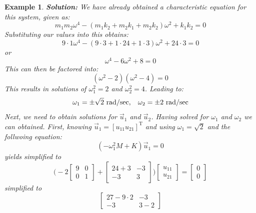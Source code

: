 \documentclass[12pt,letter]{article}
\newtheorem{ex}{Example}
\numberwithin{ex}{section} %
\newenvironment{example}{\begin{mdframed}[middlelinewidth=0.5mm]\begin{ex}\normalfont}{\end{ex}\end{mdframed}}
\numberwithin{re}{section} %
\begin{document}
\begin{example}
\textbf{Solution:} We have already obtained a characteristic equation for this system, given as:
\begin{equation}
m_1 m_2 \omega^4 - (m_1 k_2 + m_2 k_1 + m_2 k_2)\omega^2 + k_1 k_2 = 0
\end{equation}
Substituting our values into this obtains:
\begin{equation}
9 \cdot 1 \omega^4 - (9 \cdot 3 + 1 \cdot 24 + 1 \cdot 3)\omega^2 + 24 \cdot 3 = 0
\end{equation}
or
\begin{equation}
\omega^4 - 6\omega^2 + 8 =0
\end{equation}
This can then be factored into:
\begin{equation}
(\omega^2-2)(\omega^2-4)=0
\end{equation}
This results in solutions of $\omega^2_1 = 2$ and $\omega^2_2 = 4$. Leading to:
\begin{equation}
\omega_1 = \pm \sqrt{2} \text{ rad/sec}, \hspace{2ex} \omega_2 = \pm 2 \text{ rad/sec}
\end{equation}
Next, we need to obtain solutions for $\vec{u}_1$ and $\vec{u}_2$. Having solved for $\omega_1$ and $\omega_2$ we can obtained. First, knowing $\vec{u}_1 = [u_{11} u_{21}]^\text{T}$ and using $\omega_1 = \sqrt{2}$ and the follwoing equation:
\begin{equation}
	(-\omega_1^2 M  + K)\vec{u}_1 =0
\end{equation}
yields
simplified to
\begin{equation}
	 \bigg(-2\begin{bmatrix} 9 & 0 \\   0  & 1 \end{bmatrix} + \begin{bmatrix} 24+3 & -3 \\    -3  & 3 \end{bmatrix}\bigg)\begin{bmatrix} u_{11}\\ u_{21}\end{bmatrix} = \begin{bmatrix} 0\\ 0\end{bmatrix}
\end{equation}
simplified to
\begin{equation}
	 \begin{bmatrix} 27-9\cdot 2 & -3 \\    -3  & 3-2 \end{bmatrix} 

\end{equation}
\end{example}
\end{document}
